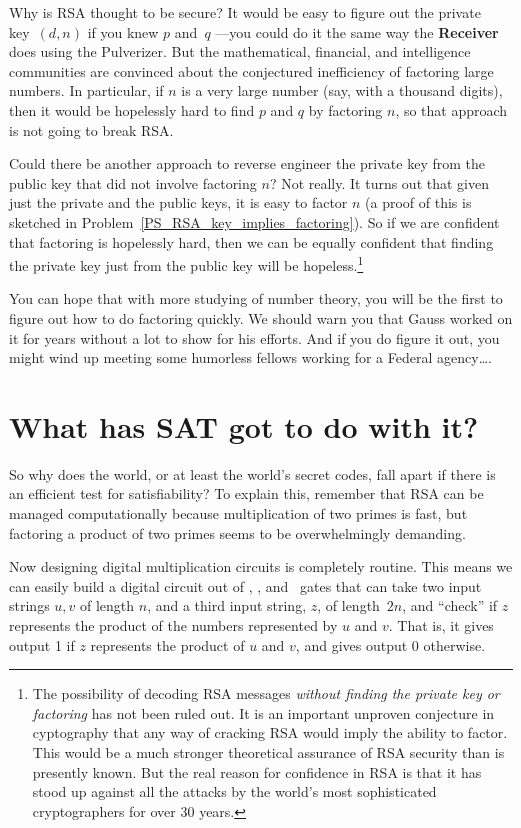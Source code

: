 Why is RSA thought to be secure?  It would be easy to figure out the
private key~$(d, n)$ if you knew $p$ and~$q$ ---you could do it the
same way the \textbf{Receiver} does using the Pulverizer.  But the
mathematical, financial, and intelligence communities are convinced
about the conjectured inefficiency of factoring large numbers.  In
particular, if $n$ is a very large number (say, with a thousand
digits), then it would be hopelessly hard to find $p$ and $q$ by
factoring $n$, so that approach is not going to break RSA.

Could there be another approach to reverse engineer the private key
from the public key that did not involve factoring $n$?  Not really.
It turns out that given just the private and the public keys, it is
easy to factor $n$ (a proof of this is sketched in
Problem~\ref{PS_RSA_key_implies_factoring}).  So if we are confident
that factoring is hopelessly hard, then we can be equally confident
that finding the private key just from the public key will be
hopeless.\footnote{The possibility of decoding RSA messages
  \emph{without finding the private key or factoring} has not been
  ruled out.  It is an important unproven conjecture in cyptography
  that any way of cracking RSA would imply the ability to factor.
  This would be a much stronger theoretical assurance of RSA security
  than is presently known.  But the real reason for confidence in RSA
  is that it has stood up against all the attacks by the world's most
  sophisticated cryptographers for over 30 years.}

You can hope that with more studying of number theory, you will be the
first to figure out how to do factoring quickly.  We should warn you
that Gauss worked on it for years without a lot to show for his
efforts.  And if you do figure it out, you might wind up meeting some
humorless fellows working for a Federal agency\dots.

\section{What has SAT got to do with it?}\label{SAT_RSA_sec}
So why does the world, or at least the world's secret codes, fall apart if there is an
efficient test for satisfiability?  To explain this, remember that RSA can be managed
computationally because multiplication of two primes is fast, but factoring a product of
two primes seems to be overwhelmingly demanding.

Now designing digital multiplication circuits is completely routine.  This means we can
easily build a digital circuit out of \QAND, \QOR, and \QNOT\ gates that can take two input
strings $u,v$ of length $n$, and a third input string, $z$, of length~$2n$, and ``check''
if $z$ represents the product of the numbers represented by $u$ and $v$.  That is, it gives
output 1 if $z$ represents the product of $u$ and $v$, and gives output 0 otherwise.

